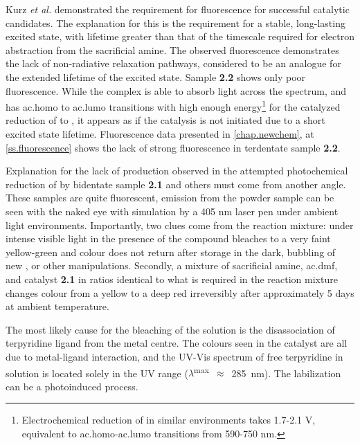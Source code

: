
Kurz \textit{et al.} demonstrated the requirement for fluorescence for successful catalytic candidates\autocite{kurz2006}. The explanation for this is the requirement for a stable, long-lasting excited state, with lifetime greater than that of the timescale required for electron abstraction from the sacrificial amine. The observed fluorescence demonstrates the lack of non-radiative relaxation pathways, considered to be an analogue for the extended lifetime of the excited state. Sample \textbf{2.2} shows only poor fluorescence. While the complex is able to absorb light across the spectrum, and has \gls{ac.homo} to \gls{ac.lumo} transitions with high enough energy\footnote{Electrochemical reduction of  in similar environments takes 1.7-2.1 V, equivalent to \gls{ac.homo}-\gls{ac.lumo} transitions from 590-750 nm\autocite{grills2014}.} for the catalyzed reduction of  to , it appears as if the catalysis is not initiated due to a short excited state lifetime. Fluorescence data presented in \autoref{chap.newchem}, at \autoref{ss.fluorescence} shows the lack of strong fluorescence in terdentate sample \textbf{2.2}.

Explanation for the lack of  production observed in the attempted photochemical reduction of  by bidentate sample \textbf{2.1} and others must come from another angle. These samples are quite fluorescent, emission from the powder sample can be seen with the naked eye with simulation by a 405 nm laser pen under ambient light environments. Importantly, two clues come from the reaction mixture: under intense visible light in the presence of  the compound bleaches to a very faint yellow-green and colour does not return after storage in the dark, bubbling of new , or other manipulations. Secondly, a mixture of sacrificial amine, \gls{ac.dmf}, and catalyst \textbf{2.1} in ratios identical to what is required in the reaction mixture changes colour from a yellow to a deep red irreversibly after approximately 5 days at ambient temperature. 

The most likely cause for the bleaching of the solution is the disassociation of terpyridine ligand from the metal centre. The colours seen in the catalyst are all due to metal-ligand interaction, and the UV-Vis spectrum of free terpyridine in solution is located solely in the UV range ($\lambda$\textsuperscript{max}~$\approx$~285~nm)\autocite{martin1956}. The labilization can be a photoinduced process\autocite{zink2001}. 

